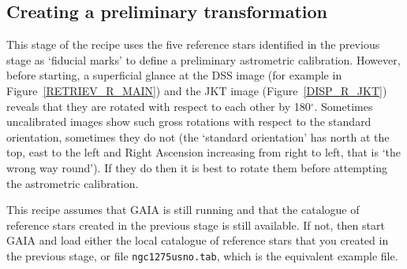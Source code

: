\documentclass[twoside,11pt]{article}
\begin{document}
\subsection{Creating a preliminary transformation}

This stage of the recipe uses the five reference stars identified in the
previous stage as `fiducial marks' to define a preliminary astrometric
calibration.  However, before starting, a superficial glance at the
DSS image (for example in Figure~\ref{RETRIEV_R_MAIN}) and the
JKT image (Figure~\ref{DISP_R_JKT}) reveals that they are rotated with
respect to each other by 180$^{\circ}$.  Sometimes uncalibrated images
show such gross rotations with respect to the standard orientation,
sometimes they do not (the `standard orientation' has north at the top,
east to the left and Right Ascension increasing from right to left, that
is `the wrong way round').  If they do then it is best to rotate them
before attempting the astrometric calibration.

This recipe assumes that GAIA is still running and that the catalogue of
reference stars created in the previous stage is still available.  If not,
then start GAIA and load either the local catalogue of reference stars
that you created in the previous stage, or file  {\tt ngc1275usno.tab},
which is the equivalent example file.
\end{document}
